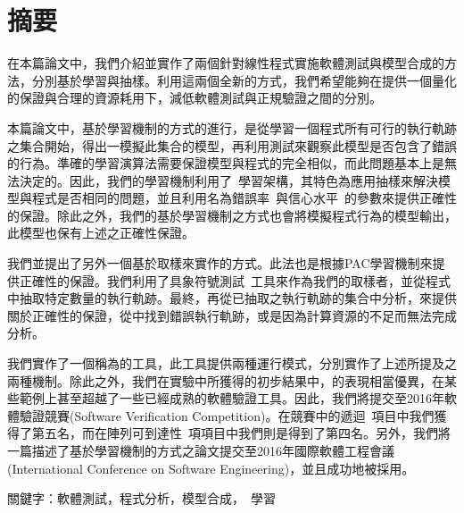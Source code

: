 \newcommand{\eng}[1]{\ \raisebox{1pt}{#1}}

\chapter{摘要}

在本篇論文中，我們介紹並實作了兩個針對線性程式實施軟體測試與模型合成的方法，分別基於學習與抽樣。利用這兩個全新的方式，我們希望能夠在提供一個量化的保證與合理的資源耗用下，減低軟體測試與正規驗證之間的分別。\newline

本篇論文中，基於學習機制的方式的進行，是從學習一個程式所有可行的執行軌跡之集合開始，得出一模擬此集合的模型，再利用測試來觀察此模型是否包含了錯誤的行為。準確的學習演算法需要保證模型與程式的完全相似，而此問題基本上是無法決定的。因此，我們的學習機制利用了\eng{Probably Approximately Correct (PAC)}學習架構，其特色為應用抽樣來解決模型與程式是否相同的問題，並且利用名為錯誤率\eng{(error probability)}與信心水平\eng{(confidence level)}的參數來提供正確性的保證。除此之外，我們的基於學習機制之方式也會將模擬程式行為的模型輸出，此模型也保有上述之正確性保證。\newline

我們並提出了另外一個基於取樣來實作的方式。此法也是根據PAC學習機制來提供正確性的保證。我們利用了具象符號測試\eng{(Concolic Testing)}工具來作為我們的取樣者，並從程式中抽取特定數量的執行軌跡。最終，再從已抽取之執行軌跡的集合中分析，來提供關於正確性的保證，從中找到錯誤執行軌跡，或是因為計算資源的不足而無法完成分析。\newline

我們實作了一個稱為\PACMAN 的工具，此工具提供兩種運行模式，分別實作了上述所提及之兩種機制。除此之外，我們在實驗中所獲得的初步結果中，\PACMAN 的表現相當優異，在某些範例上甚至超越了一些已經成熟的軟體驗證工具。因此，我們將\PACMAN 提交至2016年軟體驗證競賽(Software Verification Competition)。在競賽中的遞迴\eng{(Recursive)}項目中我們獲得了第五名，而在陣列可到達性\eng{(Array-reach)}項項目中我們則是得到了第四名。另外，我們將一篇描述了基於學習機制的方式之論文提交至2016年國際軟體工程會議(International Conference on Software Engineering)，並且成功地被採用。\newline

關鍵字：軟體測試，程式分析，模型合成，\eng{PAC}學習


%
%
